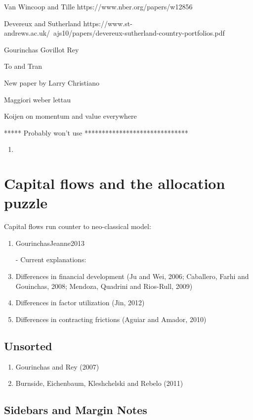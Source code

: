 \documentclass{ar-1col}
\begin{document}
Van Wincoop and Tille https://www.nber.org/papers/w12856

Devereux and Sutherland https://www.st-andrews.ac.uk/~ajs10/papers/devereux-sutherland-country-portfolios.pdf

Gourinchas Govillot Rey

To and Tran

New paper by Larry Christiano

Maggiori weber lettau

Koijen on momentum and value everywhere

***** Probably won't use ******************************


\begin{enumerate}
    \item \citet{Backusetal2001}
\end{enumerate}

\section*{Capital flows and the allocation puzzle}
Capital flows run counter to neo-classical model:
\begin{enumerate}
\item GourinchasJeanne2013
\item[-] Current explanations:
\item Differences in financial development (Ju and Wei, 2006;
  Caballero, Farhi and Gouinchas, 2008; Mendoza, Quadrini and
  Rios-Rull, 2009)
\item Differences in factor utilization (Jin, 2012)
\item Differences in contracting frictions (Aguiar and Amador, 2010)
\end{enumerate}


\subsection{Unsorted}
\begin{enumerate}
\item Gourinchas and Rey (2007)
\item Burnside, Eichenbaum, Kleshchelski and Rebelo (2011)
\end{enumerate}



\subsection{Sidebars and Margin Notes}
\begin{marginnote}[]
    
\end{marginnote}
\end{document}
